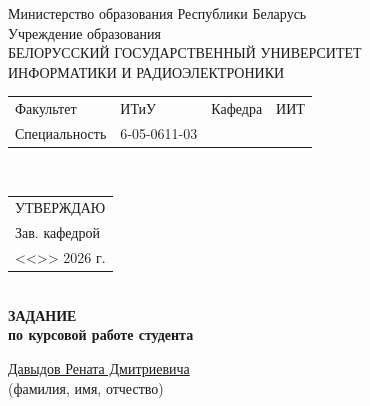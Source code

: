 {
  \thispagestyle{empty}
  \setlength{\parindent}{0em}

  \newcommand{\lineunderscore}{\uline{\hspace*{\fill}}}

  \begin{center}
    Министерство образования Республики Беларусь\\
    Учреждение образования\\
    БЕЛОРУССКИЙ ГОСУДАРСТВЕННЫЙ УНИВЕРСИТЕТ \\
    ИНФОРМАТИКИ И РАДИОЭЛЕКТРОНИКИ\\[1em]
  

  \begin{minipage}{\textwidth}
    \begin{flushleft}
      \begin{tabular}{ p{}p{}p{}p{} @{} }
        Факультет & ИТиУ & Кафедра & ИИТ \\
        Специальность   & 6‑05-0611-03
      \end{tabular}
    \end{flushleft}
  \end{minipage}\\[1em]

  \begin{minipage}{\textwidth}
    \begin{flushright}
      \begin{tabular}{p{}}
        УТВЕРЖДАЮ \\[0.5em]
        \underline{\hspace*{6em}} Зав. кафедрой \\
        
        <<\underline{\hspace*{4ex}}>> \underline{\hspace*{7em}} 2026 г.
      \end{tabular}
    \end{flushright}
  \end{minipage}\\[1em]

  \textbf{ЗАДАНИЕ} \\
  \textbf{по курсовой работе студента}

  \lineunderscore\uline{Давыдов Рената Дмитриевича}\lineunderscore \\
  {\small (фамилия, имя, отчество) }


\end{center}}
